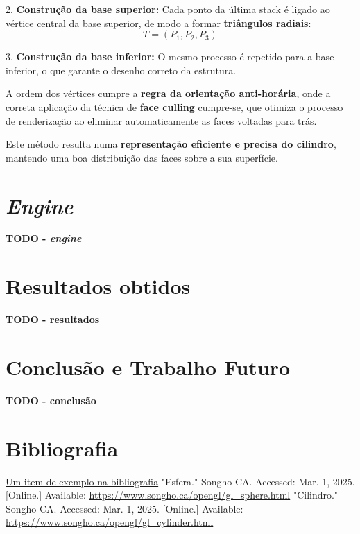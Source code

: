 \documentclass[12pt, a4paper]{article}
\begin{document}
2. \textbf{Construção da base superior:}
Cada ponto da última stack é ligado ao vértice central da base superior, de modo a formar
\textbf{triângulos radiais}:
\[
T = (P_1, P_2, P_3)
\]

3. \textbf{Construção da base inferior:}
O mesmo processo é repetido para a base inferior, o que garante o desenho correto da estrutura.

A ordem dos vértices cumpre a \textbf{regra da orientação anti-horária}, onde a correta
aplicação da técnica de \textbf{face culling} cumpre-se, que otimiza o processo de renderização
ao eliminar automaticamente as faces voltadas para trás.

Este método resulta numa \textbf{representação eficiente e precisa do cilindro}, mantendo uma boa
distribuição das faces sobre a sua superfície.

\section{\emph{Engine}}

\textbf{\color{red} TODO - \emph{engine}}

\section{Resultados obtidos}

\textbf{\color{red} TODO - resultados}

\section{Conclusão e Trabalho Futuro}

\textbf{\color{red} TODO - conclusão}

\begingroup
\section{Bibliografia}
\renewcommand{\section}[2]{}

\begin{thebibliography}{9}
        \href{https://youtu.be/dQw4w9WgXcQ}{Um item de exemplo na bibliografia}
        "Esfera."{} Songho CA. Accessed: Mar. 1, 2025. [Online.] Available:
        \url{https://www.songho.ca/opengl/gl_sphere.html}
        "Cilindro."{} Songho CA. Accessed: Mar. 1, 2025. [Online.] Available:
        \url{https://www.songho.ca/opengl/gl_cylinder.html}
\end{thebibliography}
\endgroup
\end{document}
